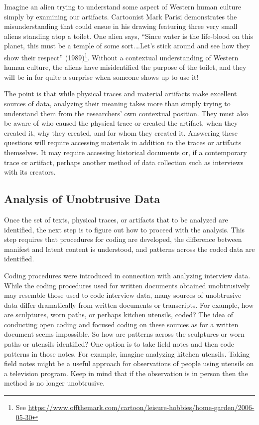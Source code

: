 Imagine an alien trying to understand some aspect of Western human culture simply by examining our artifacts. Cartoonist Mark Parisi demonstrates the misunderstanding that could ensue in his drawing featuring three very small aliens standing atop a toilet. One alien says, ``Since water is the life-blood on this planet, this must be a temple of some sort.…Let's stick around and see how they show their respect'' (1989)\footnote{See \url{https://www.offthemark.com/cartoon/leisure-hobbies/home-garden/2006-05-30}}. Without a contextual understanding of Western human culture, the aliens have misidentified the purpose of the toilet, and they will be in for quite a surprise when someone shows up to use it!

The point is that while physical traces and material artifacts make excellent sources of data, analyzing their meaning takes more than simply trying to understand them from the researchers' own contextual position. They must also be aware of who caused the physical trace or created the artifact, when they created it, why they created, and for whom they created it. Answering these questions will require accessing materials in addition to the traces or artifacts themselves. It may require accessing historical documents or, if a contemporary trace or artifact, perhaps another method of data collection such as interviews with its creators.

\subsection{Analysis of Unobtrusive Data}

Once the set of texts, physical traces, or artifacts that to be analyzed are identified, the next step is to figure out how to proceed with the analysis. This step requires that procedures for coding are developed, the difference between manifest and latent content is understood, and patterns across the coded data are identified.

Coding procedures were introduced in connection with analyzing interview data. While the coding procedures used for written documents obtained unobtrusively may resemble those used to code interview data, many sources of unobtrusive data differ dramatically from written documents or transcripts. For example, how are sculptures, worn paths, or perhaps kitchen utensils, coded? The idea of conducting open coding and focused coding on these sources as for a written document seems impossible. So how are patterns across the sculptures or worn paths or utensils identified? One option is to take field notes and then code patterns in those notes. For example, imagine analyzing kitchen utensils. Taking field notes might be a useful approach for observations of people using utensils on a television program. Keep in mind that if the observation is in person then the method is no longer unobtrusive.

